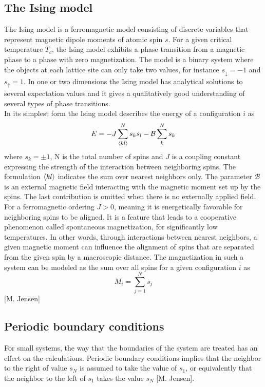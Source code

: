 \documentclass[%
reprint,nofootinbib,
amsmath,amssymb,
aps,
]{revtex4-1}
\begin{document}
\subsection*{The Ising model} \noindent 
The Ising model is a ferromagnetic model consisting of discrete variables that represent magnetic dipole moments of atomic spin $s$. For a given critical temperature $T_c$, the Ising model exhibits a phase transition from a magnetic phase to a phase with zero magnetization. The model is a binary system where the objects at each lattice site can only take two values, for instance $s_\downarrow = -1$ and $s_\uparrow = 1$. In one or two dimensions the Ising model has analytical solutions to several expectation values and it gives a qualitatively good understanding of several types of phase transitions. \\ \indent 
In its simplest form the Ising model describes the energy of a configuration $i$ as  
\begin{equation}\label{isemodel}
	E = -J\sum_{\expval{kl}}^{N}s_ks_l -\mathcal{B} \sum_{k}^{N} s_k
\end{equation}
where $s_k = \pm 1$, N is the total number of spins and $J$ is a coupling constant expressing the strength of the interaction between neighboring spins. The formulation $\expval{kl}$ indicates the sum over nearest neighbors only. The parameter $\mathcal{B}$ is an external magnetic field interacting with the magnetic moment set up by the spins. The last contribution is omitted when there is no externally applied field.\\ \indent 
For a ferromagnetic ordering $J> 0$, meaning it is energetically favorable for neighboring spins to be aligned. It is a feature that leads to a cooperative phenomenon called spontaneous magnetization, for significantly low temperatures. In other words, through interactions between nearest neighbors, a given magnetic moment can influence the alignment of spins that are separated from the given spin by a macroscopic distance. The magnetization in such a system can be modeled as the sum over all spins for a given configuration $i$ as \\ 
\begin{equation}\label{mf}
M_i = \sum_{j = 1}^{N}s_j
\end{equation}
\hspace{6.9cm}[M. Jensen]
\subsection*{Periodic boundary conditions} \noindent 
For small systems, the way that the boundaries of the system are treated has an effect on the calculations. Periodic boundary conditions implies that the neighbor to the right of value $s_N$ is assumed to take the value of $s_1$, or equivalently that the neighbor to the left of $s_1$ takes the value $s_N$ [M. Jensen]. 
\end{document}
